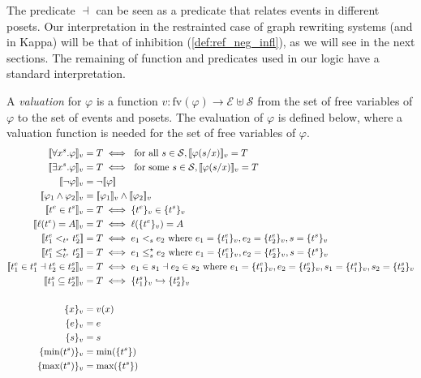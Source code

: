 The predicate $\dashv$ can be seen as a predicate that relates events in different posets. Our interpretation in the restrainted case of graph rewriting systems (and in Kappa) will be that of inhibition (\autoref{def:ref_neg_infl}), as we will see in the next sections. The remaining of function and predicates used in our logic have a standard interpretation.

A \emph{valuation} for $\varphi$ is a function
$v:\text{fv}(\varphi)\to\mathcal{E}\uplus\mathcal{S}$
from the set of free variables of $\varphi$ to the set of events and posets.
%
The evaluation of $\varphi$ is defined below, where a valuation function is needed for the set of free variables of $\varphi$.
\begin{align*}
  \enc{\forall x^s.\varphi}_{v} &= T \iff\text{ for all }s\in\mathcal{S}, \enc{\varphi(s/x)}_{v} = T\\
  \enc{\exists x^s.\varphi}_{v} &= T \iff\text{ for some }s\in\mathcal{S}, \enc{\varphi(s/x)}_{v} = T\\
  \enc{\neg\varphi}_v &= \neg\enc{\varphi} \\
  \enc{\varphi_1\wedge\varphi_2}_v &= \enc{\varphi_1}_v\wedge\enc{\varphi_2}_v\\
  \enc{t^e\in t^s}_v &= T\iff\enct{t^e}_v\in\enct{t^s}_v\\
  \enc{\labl(t^e) = A}_v &= T\iff\labl(\enct{t^e}_v)=A\\
  \enc{t^e_1 <_{t^s} t^e_2} &= T\iff e_1 <_s e_2\text{ where }e_1 = \enct{t^e_1}_v,e_2 = \enct{t^e_2}_v,s = \enct{t^s}_v\\
  \enc{t^e_1 \tleq_{t^s} t^e_2} &= T\iff e_1 \tleq_s e_2\text{ where }e_1 = \enct{t^e_1}_v,e_2 = \enct{t^e_2}_v,s = \enct{t^s}_v\\
  \enc{t^e_1\in t^s_1 \dashv t^e_2\in t^s_2}_v &= T\iff e_1\in s_1 \dashv e_2\in s_2\text{ where }
  e_1 = \enct{t^e_1}_v,e_2 = \enct{t^e_2}_v,s_1 = \enct{t^s_1}_v,s_2 = \enct{t^s_2}_v\\
  \enc{t^s_1\subseteq t^s_2}_v &= T\iff\enct{t^s_1}_v\emb \enct{t^s_2}_v\\
  \\
  \enct{x}_{v} &= v(x)\\
  \enct{e}_{v} &= e\\
  \enct{s}_{v} &= s\\
  \enct{\text{min}(t^s)}_{v} &= \text{min}(\enct{t^s})\\
  \enct{\text{max}(t^s)}_{v} &= \text{max}(\enct{t^s})\\
\end{align*}

